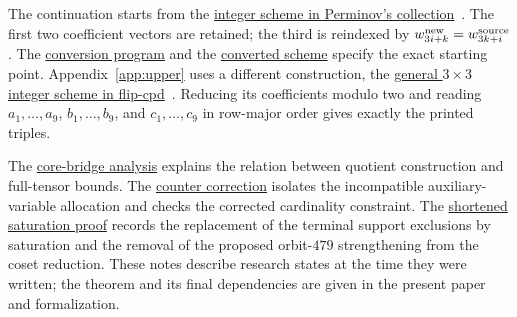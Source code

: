 The continuation starts from the
\href{https://github.com/dronperminov/FastMatrixMultiplication/blob/e703f18cbc157cec8ef68cc60bc9de0a149661ae/schemes/results/serendipitous_base/3x3x3_m23_8d34d377660f8f8d8b32cd4b6a1e1c40a5093dd0_ZT.json}{integer scheme in Perminov's collection}~\cite{perminov-code}.
The first two coefficient vectors are retained; the third is
reindexed by $w^{\rm new}_{3i+k}=w^{\rm source}_{3k+i}$.
The
\href{https://github.com/Oxelra-AI/Qiushi-Engine-Matmul-Research/blob/01b4a6baf3788bf3f14af98a653ea22dafa0691c/research/materials/exact_baselines/code/fmm_to_qmm.py}{conversion program}
and the
\href{https://github.com/Oxelra-AI/Qiushi-Engine-Matmul-Research/blob/01b4a6baf3788bf3f14af98a653ea22dafa0691c/research/materials/exact_baselines/results/fmm_r23_schemes/serendipitous_8d34.qmm}{converted scheme}
specify the exact starting point. Appendix~\ref{app:upper} uses a
different construction, the
\href{https://github.com/khoruzhii/flip-cpd/blob/9eeb17f487f14103d7128cf290ae61535d8983b1/data/schemes_paper/gg-333-rank23-rec-0-0-0-z.txt}{general $3\times3$ integer scheme in flip-cpd}~\cite{flip-cpd}.
Reducing its coefficients modulo two and reading
$a_1,\ldots,a_9$, $b_1,\ldots,b_9$, and $c_1,\ldots,c_9$
in row-major order gives exactly the printed triples.

The
\href{https://github.com/Oxelra-AI/Qiushi-Engine-Matmul-Research/blob/01b4a6baf3788bf3f14af98a653ea22dafa0691c/research/materials/quotient_cores/notes/core_bridge_review.md}{core-bridge analysis}
explains the relation between quotient construction and full-tensor
bounds. The
\href{https://github.com/Oxelra-AI/Qiushi-Engine-Matmul-Research/blob/01b4a6baf3788bf3f14af98a653ea22dafa0691c/research/materials/finite_certification/notes/seqcounter_error.md}{counter correction}
isolates the incompatible auxiliary-variable allocation and checks
the corrected cardinality constraint. The
\href{https://github.com/Oxelra-AI/Qiushi-Engine-Matmul-Research/blob/01b4a6baf3788bf3f14af98a653ea22dafa0691c/research/materials/structural_obstruction/notes/short_saturated_lower_bound_route.md}{shortened saturation proof}
records the replacement of the terminal support exclusions by saturation
and the removal of the proposed orbit-$479$ strengthening from the
coset reduction. These notes describe research states at
the time they were written; the theorem and its final dependencies are
given in the present paper and formalization.
